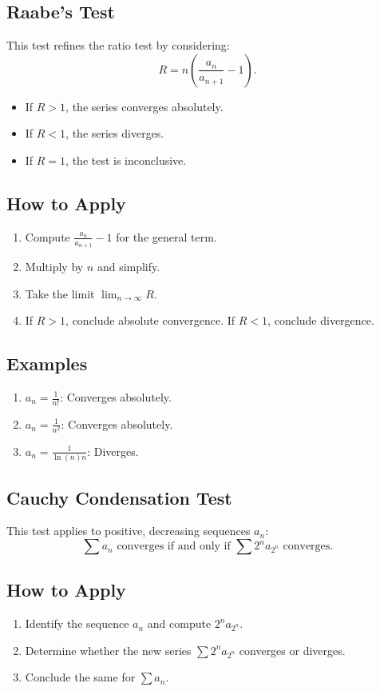 \documentclass[a4paper, 12pt]{article}
\begin{document}
\subsection{Raabe’s Test}
This test refines the ratio test by considering:
\[
R = n \left(\frac{a_n}{a_{n+1}} - 1\right).
\]
\begin{itemize}
    \item If \(R > 1\), the series converges absolutely.
    \item If \(R < 1\), the series diverges.
    \item If \(R = 1\), the test is inconclusive.
\end{itemize}

\subsection*{How to Apply}
\begin{enumerate}
    \item Compute \(\frac{a_n}{a_{n+1}} - 1\) for the general term.
    \item Multiply by \(n\) and simplify.
    \item Take the limit \(\lim_{n \to \infty} R\).
    \item If \(R > 1\), conclude absolute convergence. If \(R < 1\), conclude divergence.
\end{enumerate}

\subsection*{Examples}
\begin{enumerate}
    \item \(a_n = \frac{1}{n!}\): Converges absolutely.
    \item \(a_n = \frac{1}{n^2}\): Converges absolutely.
    \item \(a_n = \frac{1}{\ln(n) n}\): Diverges.
\end{enumerate}

\subsection{Cauchy Condensation Test}
This test applies to positive, decreasing sequences \(a_n\):
\[
\sum a_n \text{ converges if and only if } \sum 2^n a_{2^n} \text{ converges.}
\]

\subsection*{How to Apply}
\begin{enumerate}
    \item Identify the sequence \(a_n\) and compute \(2^n a_{2^n}\).
    \item Determine whether the new series \(\sum 2^n a_{2^n}\) converges or diverges.
    \item Conclude the same for \(\sum a_n\).
\end{enumerate}
\end{document}
